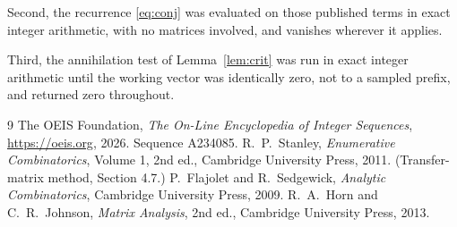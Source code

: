 \documentclass[11pt,a4paper]{article}
\theoremstyle{plain}
\theoremstyle{definition}
\begin{document}
Second, the recurrence \eqref{eq:conj} was evaluated on those published terms in exact
integer arithmetic, with no matrices involved, and vanishes wherever it applies.

Third, the annihilation test of Lemma~\ref{lem:crit} was run in exact integer arithmetic
until the working vector was identically zero, not to a sampled prefix, and returned zero
throughout.

\begin{thebibliography}{9}
 The OEIS Foundation, \emph{The On-Line Encyclopedia of Integer
Sequences}, \url{https://oeis.org}, 2026. Sequence A234085.
 R.~P.~Stanley, \emph{Enumerative Combinatorics}, Volume 1, 2nd ed.,
Cambridge University Press, 2011. (Transfer-matrix method, Section 4.7.)
 P.~Flajolet and R.~Sedgewick, \emph{Analytic Combinatorics}, Cambridge
University Press, 2009.
 R.~A.~Horn and C.~R.~Johnson, \emph{Matrix Analysis}, 2nd ed., Cambridge
University Press, 2013.
\end{thebibliography}
\end{document}
